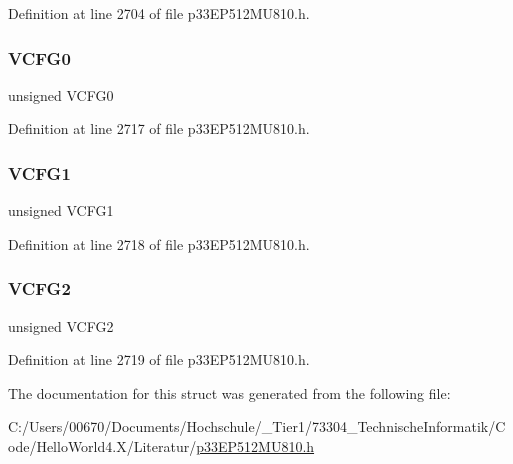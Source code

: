 Definition at line 2704 of file p33\+E\+P512\+M\+U810.\+h.

\mbox{\label{structtag_a_d2_c_o_n2_b_i_t_s_afb91efccb5c64031ed340b5f78a99568}} 
\subsubsection{\texorpdfstring{V\+C\+F\+G0}{VCFG0}}
{\footnotesize\ttfamily unsigned V\+C\+F\+G0}



Definition at line 2717 of file p33\+E\+P512\+M\+U810.\+h.

\mbox{\label{structtag_a_d2_c_o_n2_b_i_t_s_abdb5b9805fa4bb09217bb2b134565c1a}} 
\subsubsection{\texorpdfstring{V\+C\+F\+G1}{VCFG1}}
{\footnotesize\ttfamily unsigned V\+C\+F\+G1}



Definition at line 2718 of file p33\+E\+P512\+M\+U810.\+h.

\mbox{\label{structtag_a_d2_c_o_n2_b_i_t_s_ad26fd7d13c850437b5d14a6e95f47483}} 
\subsubsection{\texorpdfstring{V\+C\+F\+G2}{VCFG2}}
{\footnotesize\ttfamily unsigned V\+C\+F\+G2}



Definition at line 2719 of file p33\+E\+P512\+M\+U810.\+h.



The documentation for this struct was generated from the following file\+:\begin{DoxyCompactItemize}
\item 
C\+:/\+Users/00670/\+Documents/\+Hochschule/\+\_\+\+Tier1/73304\+\_\+\+Technische\+Informatik/\+Code/\+Hello\+World4.\+X/\+Literatur/\hyperlink{p33_e_p512_m_u810_8h}{p33\+E\+P512\+M\+U810.\+h}\end{DoxyCompactItemize}
